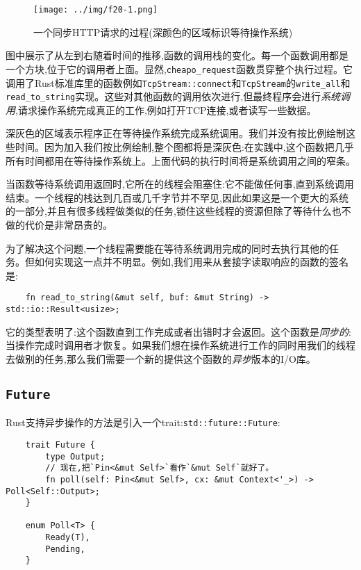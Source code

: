 \begin{figure}[htbp]
    \centering
    \texttt{[image: ../img/f20-1.png]}
    \caption{一个同步HTTP请求的过程(深颜色的区域标识等待操作系统)}
    \label{f20-1}
\end{figure}

图中展示了从左到右随着时间的推移,函数的调用栈的变化。每一个函数调用都是一个方块,位于它的调用者上面。显然,\texttt{cheapo\_request}函数贯穿整个执行过程。它调用了Rust标准库里的函数例如\texttt{TcpStream::connect}和\texttt{TcpStream}的\texttt{write\_all}和\texttt{read\_to\_string}实现。这些对其他函数的调用依次进行,但最终程序会进行\emph{系统调用},请求操作系统完成真正的工作,例如打开TCP连接,或者读写一些数据。

深灰色的区域表示程序正在等待操作系统完成系统调用。我们并没有按比例绘制这些时间。因为加入我们按比例绘制,整个图都将是深灰色:在实践中,这个函数把几乎所有时间都用在等待操作系统上。上面代码的执行时间将是系统调用之间的窄条。

当函数等待系统调用返回时,它所在的线程会阻塞住:它不能做任何事,直到系统调用结束。一个线程的栈达到几百或几千字节并不罕见,因此如果这是一个更大的系统的一部分,并且有很多线程做类似的任务,锁住这些线程的资源但除了等待什么也不做的代价是非常昂贵的。

为了解决这个问题,一个线程需要能在等待系统调用完成的同时去执行其他的任务。但如何实现这一点并不明显。例如,我们用来从套接字读取响应的函数的签名是:
\begin{verbatim}
    fn read_to_string(&mut self, buf: &mut String) -> std::io::Result<usize>;
\end{verbatim}

它的类型表明了:这个函数直到工作完成或者出错时才会返回。这个函数是\emph{同步的}:当操作完成时调用者才恢复。如果我们想在操作系统进行工作的同时用我们的线程去做别的任务,那么我们需要一个新的提供这个函数的\emph{异步}版本的I/O库。

\subsection{\texttt{Future}}
Rust支持异步操作的方法是引入一个trait:\texttt{std::future::Future}:
\begin{verbatim}
    trait Future {
        type Output;
        // 现在,把`Pin<&mut Self>`看作`&mut Self`就好了。
        fn poll(self: Pin<&mut Self>, cx: &mut Context<'_>) -> Poll<Self::Output>;
    }

    enum Poll<T> {
        Ready(T),
        Pending,
    }
\end{verbatim}

